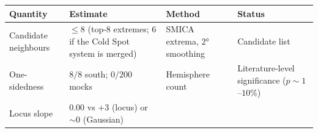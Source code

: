 \documentclass[
]{article}
\begin{document}
\begin{longtable}[]{@{}llll@{}}
\toprule
\begin{minipage}[b]{0.22\columnwidth}\raggedright
Quantity\strut
\end{minipage} & \begin{minipage}[b]{0.22\columnwidth}\raggedright
Estimate\strut
\end{minipage} & \begin{minipage}[b]{0.22\columnwidth}\raggedright
Method\strut
\end{minipage} & \begin{minipage}[b]{0.22\columnwidth}\raggedright
Status\strut
\end{minipage}\tabularnewline
\midrule
\endhead
\begin{minipage}[t]{0.22\columnwidth}\raggedright
Candidate neighbours\strut
\end{minipage} & \begin{minipage}[t]{0.22\columnwidth}\raggedright
\(\leq 8\) (top-8 extremes; \(6\) if the Cold Spot system is
merged)\strut
\end{minipage} & \begin{minipage}[t]{0.22\columnwidth}\raggedright
SMICA extrema, \(2°\) smoothing\strut
\end{minipage} & \begin{minipage}[t]{0.22\columnwidth}\raggedright
Candidate list\strut
\end{minipage}\tabularnewline
\begin{minipage}[t]{0.22\columnwidth}\raggedright
One-sidedness\strut
\end{minipage} & \begin{minipage}[t]{0.22\columnwidth}\raggedright
\(8/8\) south; \(0/200\) mocks\strut
\end{minipage} & \begin{minipage}[t]{0.22\columnwidth}\raggedright
Hemisphere count\strut
\end{minipage} & \begin{minipage}[t]{0.22\columnwidth}\raggedright
Literature-level significance (\(p \sim 1\)--\(10\%\))\strut
\end{minipage}\tabularnewline
\begin{minipage}[t]{0.22\columnwidth}\raggedright
Locus slope\strut
\end{minipage} & \begin{minipage}[t]{0.22\columnwidth}\raggedright
\(0.00\) vs \(+3\) (locus) or \(\sim\!0\) (Gaussian)\strut
\end{minipage} & \begin{minipage}[t]{0.22\columnwidth}\raggedright

\end{minipage}
\end{longtable}
\end{document}
